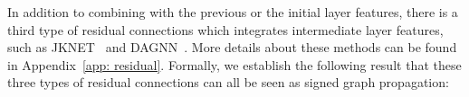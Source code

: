 In addition to combining with the previous or the initial layer features, there is a third type of residual connections which integrates intermediate layer features, such as JKNET~\citep{jknet} and DAGNN~\citep{dagnn}.
More details about these methods can be found in Appendix~\ref{app: residual}.
Formally, we establish the following result that these three types of residual connections can all be seen as signed graph propagation:
\begingroup
\setlength{\abovedisplayskip}{3pt} %
\setlength{\belowdisplayskip}{3pt}
